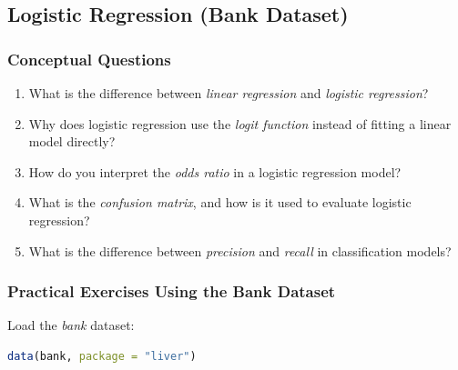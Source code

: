 \documentclass[
  11pt,
]{book}
\providecommand{\tightlist}{%
  \setlength{\itemsep}{0pt}\setlength{\parskip}{0pt}}
\theoremstyle{definition}
\theoremstyle{definition}
\theoremstyle{definition}
\theoremstyle{definition}
\theoremstyle{remark}
\begin{document}
\subsection*{Logistic Regression (Bank Dataset)}\label{logistic-regression-bank-dataset}


\subsubsection*{Conceptual Questions}\label{conceptual-questions-8}


\begin{enumerate}
\def\labelenumi{\arabic{enumi}.}
\setcounter{enumi}{34}
\tightlist
\item
  What is the difference between \emph{linear regression} and \emph{logistic regression}?\\
\item
  Why does logistic regression use the \emph{logit function} instead of fitting a linear model directly?\\
\item
  How do you interpret the \emph{odds ratio} in a logistic regression model?\\
\item
  What is the \emph{confusion matrix}, and how is it used to evaluate logistic regression?\\
\item
  What is the difference between \emph{precision} and \emph{recall} in classification models?
\end{enumerate}

\subsubsection*{Practical Exercises Using the Bank Dataset}\label{practical-exercises-using-the-bank-dataset}


Load the \emph{bank} dataset:

\begin{lstlisting}[language=R]
data(bank, package = "liver")
\end{lstlisting}
\end{document}
